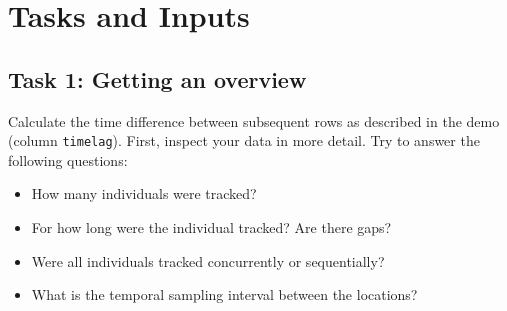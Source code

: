 \documentclass[]{book}
\newenvironment{Shaded}{\begin{snugshade}}{\end{snugshade}}
\newcommand{\CommentTok}[1]{\textcolor[rgb]{0.56,0.35,0.01}{\textit{#1}}}
\newcommand{\DataTypeTok}[1]{\textcolor[rgb]{0.13,0.29,0.53}{#1}}
\newcommand{\KeywordTok}[1]{\textcolor[rgb]{0.13,0.29,0.53}{\textbf{#1}}}
\newcommand{\NormalTok}[1]{#1}
\newcommand{\OperatorTok}[1]{\textcolor[rgb]{0.81,0.36,0.00}{\textbf{#1}}}
\newcommand{\StringTok}[1]{\textcolor[rgb]{0.31,0.60,0.02}{#1}}
\providecommand{\tightlist}{%
  \setlength{\itemsep}{0pt}\setlength{\parskip}{0pt}}
\begin{document}
\begin{Shaded}
\end{Shaded}

\hypertarget{tasks-and-inputs-1}{%
\section{Tasks and Inputs}\label{tasks-and-inputs-1}}

\hypertarget{task-1-getting-an-overview}{%
\subsection{Task 1: Getting an overview}\label{task-1-getting-an-overview}}

Calculate the time difference between subsequent rows as described in the demo (column \texttt{timelag}).
First, inspect your data in more detail. Try to answer the following questions:

\begin{itemize}
\tightlist
\item
  How many individuals were tracked?
\item
  For how long were the individual tracked? Are there gaps?
\item
  Were all individuals tracked concurrently or sequentially?
\item
  What is the temporal sampling interval between the locations?
\end{itemize}
\end{document}
